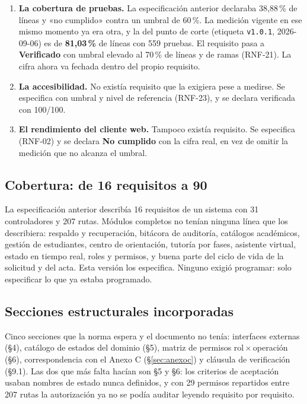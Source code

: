 \documentclass[11pt,a4paper]{article}
\newcommand{\estadoV}{\textcolor{verdeok}{\textbf{Verificado}}}
\newcommand{\estadoN}{\textcolor{rojoko}{\textbf{No cumplido}}}
\begin{document}
\begin{enumerate}
    \item \textbf{La cobertura de pruebas.} La especificación anterior declaraba 38,88\,\% de líneas y
          «no cumplido» contra un umbral de 60\,\%. La medición vigente en ese mismo momento ya
          era otra, y la del punto de corte (etiqueta \texttt{v1.0.1}, 2026-09-06) es de
          \textbf{81,03\,\%} de líneas con 559 pruebas.
          El requisito pasa a \estadoV{} con umbral elevado al 70\,\% de líneas y de ramas
          (RNF-21). La cifra ahora va fechada dentro del propio requisito.
    \item \textbf{La accesibilidad.} No existía requisito que la exigiera pese a medirse. Se
          especifica con umbral y nivel de referencia (RNF-23), y se declara verificada con
          100/100.
    \item \textbf{El rendimiento del cliente web.} Tampoco existía requisito. Se especifica
          (RNF-02) y se declara \estadoN{} con la cifra real, en vez de omitir la medición que
          no alcanza el umbral.
\end{enumerate}

\subsection{Cobertura: de 16 requisitos a 90}

La especificación anterior describía 16 requisitos de un sistema con 31 controladores y 207 rutas.
Módulos completos no tenían ninguna línea que los describiera: respaldo y recuperación, bitácora
de auditoría, catálogos académicos, gestión de estudiantes, centro de orientación, tutoría por
fases, asistente virtual, estado en tiempo real, roles y permisos, y buena parte del ciclo de
vida de la solicitud y del acta. Esta versión los especifica. Ninguno exigió programar: solo
especificar lo que ya estaba programado.

\subsection{Secciones estructurales incorporadas}

Cinco secciones que la norma espera y el documento no tenía: interfaces externas (\S4), catálogo
de estados del dominio (\S5), matriz de permisos rol\,$\times$\,operación (\S6), correspondencia
con el Anexo C (\S\ref{sec:anexoc}) y cláusula de verificación (\S9.1). Las dos que más falta
hacían son \S5 y \S6: los criterios de aceptación usaban nombres de estado nunca definidos, y
con 29 permisos repartidos entre 207 rutas la autorización ya no se podía auditar leyendo
requisito por requisito.
\end{document}
